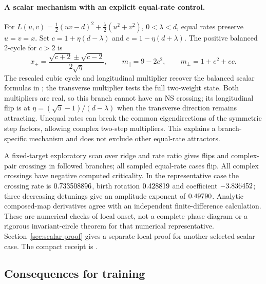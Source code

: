 \documentclass[11pt,letterpaper]{article}
\begin{document}
\paragraph{A scalar mechanism with an explicit equal-rate control.} For
$L(u,v)=\tfrac12(uv-d)^2+\tfrac\lambda2(u^2+v^2)$, $0<\lambda<d$, equal rates preserve $u=v=x$.
Set $c=1+\eta(d-\lambda)$ and $e=1-\eta(d+\lambda)$. The positive balanced 2-cycle for $c>2$ is
\begin{equation}
x_\pm=\frac{\sqrt{c+2}\pm\sqrt{c-2}}{2\sqrt\eta},\qquad
m_\parallel=9-2c^2,\qquad m_\perp=1+e^2+ec.
\end{equation}
The rescaled cubic cycle and longitudinal multiplier recover the balanced scalar formulas in
\citet[Propositions 2--3]{hofmann2026}; the transverse multiplier tests the full two-weight state.
Both multipliers are real, so this branch cannot have an NS crossing; its longitudinal flip is at
$\eta=(\sqrt5-1)/(d-\lambda)$ when the transverse direction remains attracting. Unequal rates can break the
common eigendirections of the symmetric step factors, allowing complex two-step multipliers. This explains a
branch-specific mechanism and does not exclude other equal-rate attractors.

A fixed-target exploratory scan over ridge and rate ratio gives \nScalarFlips{} flips and \nScalarNS{}
complex-pair crossings in \nScalarCases{} followed branches; all sampled equal-rate cases flip.
All complex crossings have negative computed criticality. In the representative case the crossing rate is
$0.733508896$, birth rotation $0.428819$ and coefficient $-3.836452$; three decreasing detunings give
an amplitude exponent of $0.49790$. Analytic composed-map derivatives agree with an independent
finite-difference calculation. These are numerical checks of local onset, not a complete phase diagram or a
rigorous invariant-circle theorem for that numerical representative. Section~\ref{sec:scalar-proof} gives a separate local proof for another selected scalar case. The compact receipt is .

\subsection{Consequences for training}


\end{document}
